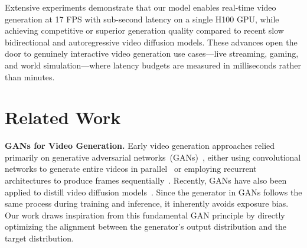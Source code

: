\documentclass{article}
\begin{document}
Extensive experiments demonstrate that our model enables real-time video generation at 17 FPS with sub-second latency on a single H100 GPU, while achieving competitive or superior generation quality compared to recent slow bidirectional and autoregressive video diffusion models.
These advances open the door to genuinely interactive video generation use cases—live streaming, gaming, and world simulation—where latency budgets are measured in milliseconds rather than minutes.


\section{Related Work}
\noindent\textbf{GANs for Video Generation.}
Early video generation approaches relied primarily on generative adversarial networks~(GANs)~\cite{goodfellow2014generative}, either using convolutional networks to generate entire videos in parallel~\cite{vondrick2016generating,saito2017temporal,brooks2022generating} or employing recurrent architectures to produce frames sequentially~\cite{villegas2017decomposing,denton2017unsupervised,tulyakov2018mocogan,liu2021infinite, li2022infinitenature}.
Recently, GANs have also been applied to distill video diffusion models~\cite{zhang2024sf,lin2025diffusion,mao2025osv,wu2025snapgen}.
Since the generator in GANs follows the same process during training and inference, it inherently avoids exposure bias. Our work draws inspiration from this fundamental GAN principle by directly optimizing the alignment between the generator's output distribution and the target distribution.
\end{document}
